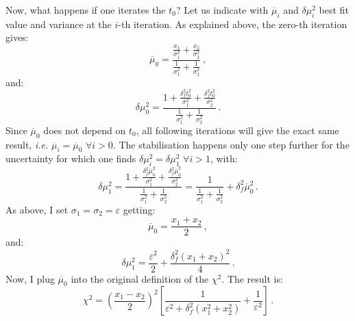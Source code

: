 \documentclass[10pt,a4paper]{article}
\begin{document}
Now, what happens if one iterates the $t_0$? Let us indicate with
$\overline{\mu}_i$ and $\delta\mu_i^2$ best fit value and variance at
the $i$-th iteration. As explained above, the zero-th iteration gives:
\begin{equation}
\overline{\mu}_0 =\frac{\frac{x_1}{\sigma_1^2}+\frac{x_2}{\sigma_2^2}}{\frac{1}{\sigma_1^2}+\frac{1}{\sigma_2^2}}\,,
\end{equation}
and:
\begin{equation}
  \delta\mu_0^2 = \frac{1+\frac{\delta_f^2 t_0^2}{\sigma_1^2}+\frac{\delta_f^2 t_0^2}{\sigma_2^2}}{\frac{1}{\sigma_1^2}+ \frac{1}{\sigma_2^2}}\,.
\end{equation}
Since $\overline{\mu}_0$ does not depend on $t_0$, all following
iterations will give the exact same result, \textit{i.e.}
$\overline{\mu}_i=\overline{\mu}_0$ $\forall i>0$. The stabilisation
happens only one step further for the uncertainty for which one finds
$\delta\mu_i^2=\delta\mu_1^2$ $\forall i>1$, with:
\begin{equation}
  \delta\mu_1^2 = \frac{1+\frac{\delta_f^2 \overline{\mu}_0^2}{\sigma_1^2}+\frac{\delta_f^2 \overline{\mu}_0^2}{\sigma_2^2}}{\frac{1}{\sigma_1^2}+ \frac{1}{\sigma_2^2}}=\frac{1}{\frac{1}{\sigma_1^2}+ \frac{1}{\sigma_2^2}}+\delta_f^2\overline{\mu}_0^2\,.
\end{equation}
As above, I set $\sigma_1=\sigma_2=\varepsilon$ getting:
\begin{equation}
\overline{\mu}_0 =\frac{x_1+x_2}{2}\,,
\end{equation}
and:
\begin{equation}
  \delta\mu_1^2 = \frac{\varepsilon^2}{2}+\frac{\delta_f^2  (x_1+x_2)^2}{4}\,.
\end{equation}
Now, I plug $\overline{\mu}_0$ into the original definition of the
$\chi^2$. The result is:
\begin{equation}
\chi^2=\left(\frac{x_1- x_2}{2}\right)^2\left[\frac{1}{\varepsilon^2+\delta_f^2(x_1^2+x_2^2)}+\frac{1}{\varepsilon^2}\right]\,.
\end{equation}
\end{document}
